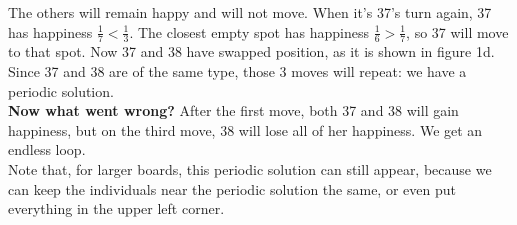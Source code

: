 The others will remain happy and will not move. When it's 37's turn again, 37 has happiness $\frac{1}{7} < \frac{1}{3}$. The closest empty spot has happiness $\frac{1}{6} > \frac{1}{7}$, so 37 will move to that spot. Now 37 and 38 have swapped position, as it is shown in figure 1d.\\
Since 37 and 38 are of the same type, those 3 moves will repeat: we have a periodic solution.\\
\textbf{Now what went wrong?} After the first move, both 37 and 38 will gain happiness, but on the third move, 38 will lose all of her happiness. We get an endless loop.\\
Note that, for larger boards, this periodic solution can still appear, because we can keep the individuals near the periodic solution the same, or even put everything in the upper left corner.
